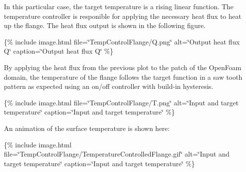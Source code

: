 In this particular case, the target temperature is a rising linear function. The temperature controller is responible for applying the necessary heat flux to heat up the flange. The heat flux output is shown in the following figure.

\{\% include image.\+html file=\char`\"{}\+Temp\+Control\+Flange/\+Q.\+png\char`\"{} alt=\char`\"{}\+Output heat flux Q\char`\"{} caption=\char`\"{}\+Output heat flux Q\char`\"{} \%\}

By applying the heat flux from the previous plot to the patch of the Open\+Foam domain, the temperature of the flange follows the target function in a saw tooth pattern as expected using an on/off controller with build-\/in hysteresis.

\{\% include image.\+html file=\char`\"{}\+Temp\+Control\+Flange/\+T.\+png\char`\"{} alt=\char`\"{}\+Input and target temperature\char`\"{} caption=\char`\"{}\+Input and target temperature\char`\"{} \%\}

An animation of the surface temperature is shown here\+:

\{\% include image.\+html file=\char`\"{}\+Temp\+Control\+Flange/\+Temperature\+Controlled\+Flange.\+gif\char`\"{} alt=\char`\"{}\+Input and target temperature\char`\"{} caption=\char`\"{}\+Input and target temperature\char`\"{} \%\} 